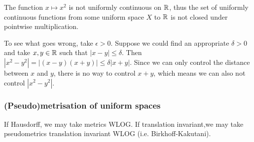\begin{example}
The function $x\mapsto x^2$ is not uniformly continuous on $\mathbb{R}$, thus the set of uniformly continuous functions from some uniform space $X$ to $\mathbb{R}$ is not closed under pointwise multiplication.

To see what goes wrong, take $\epsilon >0$. Suppose we could find an appropriate $\delta >0$ and take $x,y\in \mathbb{R}$ such that $|x-y|\leq \delta$. Then $|x^2 - y^2| = \big|(x-y)(x+y)\big|\leq \delta |x+y|$. Since we can only control the distance between $x$ and $y$, there is no way to control $x+y$, which means we can also not control $|x^2 - y^2|$.
\end{example}

\subsubsection{(Pseudo)metrisation of uniform spaces}
If Hausdorff, we may take metrics WLOG. If translation invariant,we may take pseudometrics translation invariant WLOG (i.e. Birkhoff-Kakutani).


